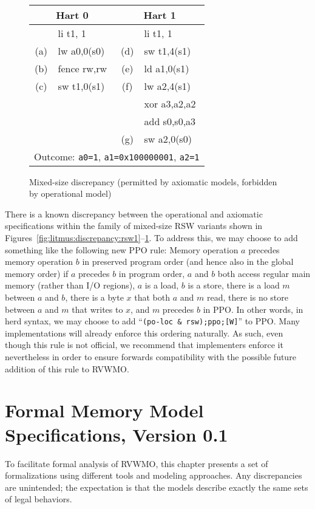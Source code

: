 \begin{figure}[h!]
  \centering\small
  {\tt
    \begin{tabular}{cl||cl}
    \multicolumn{2}{c}{Hart 0} & \multicolumn{2}{c}{Hart 1} \\
    \hline
          & li t1, 1    &     & li t1, 1      \\
      (a) & lw a0,0(s0) & (d) & sw t1,4(s1)   \\
      (b) & fence rw,rw & (e) & ld a1,0(s1)   \\
      (c) & sw t1,0(s1) & (f) & lw a2,4(s1)   \\
          &             &     & xor a3,a2,a2  \\
          &             &     & add s0,s0,a3  \\
          &             & (g) & sw a2,0(s0)   \\
      \hline
      \multicolumn{4}{c}{Outcome: {\tt a0=1}, {\tt a1=0x100000001}, {\tt a2=1}}
    \end{tabular}
  }
  \caption{Mixed-size discrepancy (permitted by axiomatic models, forbidden by operational model)}
  \label{fig:litmus:discrepancy:rsw3}
\end{figure}

There is a known discrepancy between the operational and axiomatic specifications within the family of mixed-size RSW variants shown in Figures~\ref{fig:litmus:discrepancy:rsw1}--\ref{fig:litmus:discrepancy:rsw3}.
To address this, we may choose to add something like the following new PPO rule:
Memory operation $a$ precedes memory operation $b$ in preserved program order (and hence also in the global memory order) if $a$ precedes $b$ in program order, $a$ and $b$ both access regular main memory (rather than I/O regions), $a$ is a load, $b$ is a store, there is a load $m$ between $a$ and $b$, there is a byte $x$ that both $a$ and $m$ read, there is no store between $a$ and $m$ that writes to $x$, and $m$ precedes $b$ in PPO.
In other words, in {\sf herd} syntax, we may choose to add ``{\tt (po-loc \& rsw);ppo;[W]}'' to PPO.
Many implementations will already enforce this ordering naturally.
As such, even though this rule is not official, we recommend that implementers enforce it nevertheless in order to ensure forwards compatibility with the possible future addition of this rule to RVWMO.

\chapter{Formal Memory Model Specifications, Version 0.1}
To facilitate formal analysis of RVWMO, this chapter presents a set of formalizations using different tools and modeling approaches.  Any discrepancies are unintended; the expectation is that the models describe exactly the same sets of legal behaviors.

